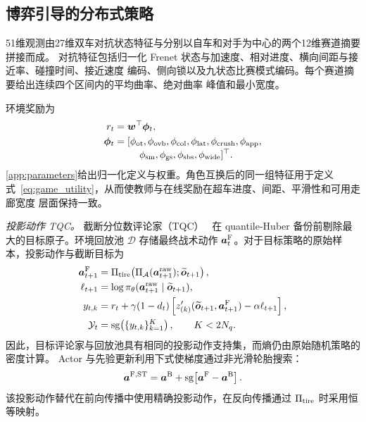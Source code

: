\documentclass[final,5p,twocolumn]{elsarticle}
\begin{document}
\subsection{博弈引导的分布式策略}
\label{subsec:theory_guided_rl}
51维观测由27维双车对抗状态特征与分别以自车和对手为中心的两个12维赛道摘要拼接而成。
对抗特征包括归一化 Frenet 状态与加速度、相对进度、横向间距与接近率、碰撞时间、接近速度
编码、侧向锁以及九状态比赛模式编码。每个赛道摘要给出连续四个区间内的平均曲率、绝对曲率
峰值和最小宽度。

环境奖励为
\begin{equation}
\begin{aligned}
r_t&=\bm w^\top\bm\phi_t,\\
\bm\phi_t&=[\phi_{\rm ot},\phi_{\rm ovb},\phi_{\rm col},\phi_{\rm lat},
\phi_{\rm crush},\phi_{\rm app},\\[-1mm]
&\hspace{9mm}\phi_{\rm sm},\phi_{\rm gs},\phi_{\rm sbs},
\phi_{\rm wide}]^\top .
\end{aligned}
\label{eq:reward_sum}
\end{equation}
\ref{app:parameters}给出归一化定义与权重。角色互换后的同一组特征用于定义
式~\eqref{eq:game_utility}，从而使教师与在线奖励在超车进度、间距、平滑性和可用走廊宽度
层面保持一致。

\emph{投影动作 TQC。} 截断分位数评论家（TQC）~\cite{kuznetsov2020tqc} 在
quantile-Huber 备份前剔除最大的目标原子。环境回放池 $\mathcal D$ 存储最终战术动作
$\bm a_t^{\rm F}$。对于目标策略的原始样本，投影动作与截断目标为
\begin{equation}
\begin{aligned}
\bm a_{t+1}^{\rm F}&=\Pi_{\rm tire}\!\left(
\Pi_{\mathcal A}(\bm a_{t+1}^{\rm raw});
\widetilde{\bm o}_{t+1}\right),\\
\ell_{t+1}&=\log\pi_\theta(\bm a_{t+1}^{\rm raw}
\mid\widetilde{\bm o}_{t+1}),\\
y_{t,k}&=r_t+\gamma(1-d_t)
\left[z_{(k)}'(\widetilde{\bm o}_{t+1},\bm a_{t+1}^{\rm F})
-\alpha\ell_{t+1}\right],\\
\mathcal Y_t&=\operatorname{sg}\!\left(\{y_{t,k}\}_{k=1}^{K}\right),
\qquad K<2N_q .
\end{aligned}
\label{eq:tqc_truncated_target}
\end{equation}
因此，目标评论家与回放池具有相同的投影动作支持集，而熵仍由原始随机策略的密度计算。
Actor 与先验更新利用下式使梯度通过非光滑轮胎搜索：
\begin{equation}
\bm a^{\rm F,ST}=\bm a^{\rm B}
+\operatorname{sg}\!\left[\bm a^{\rm F}-\bm a^{\rm B}\right].
\label{eq:tire_projection_ste}
\end{equation}
该投影动作替代在前向传播中使用精确投影动作，在反向传播通过 $\Pi_{\rm tire}$ 时采用恒等映射。
\end{document}
